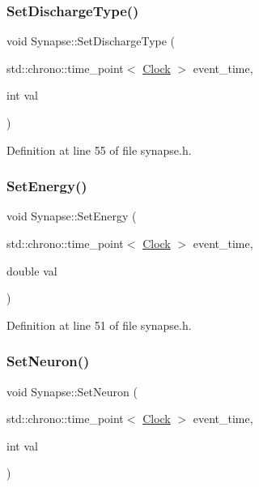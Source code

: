 \subsubsection{\texorpdfstring{Set\+Discharge\+Type()}{SetDischargeType()}}
{\footnotesize\ttfamily void Synapse\+::\+Set\+Discharge\+Type (\begin{DoxyParamCaption}\item[{std\+::chrono\+::time\+\_\+point$<$ \hyperlink{universe_8h_a0ef8d951d1ca5ab3cfaf7ab4c7a6fd80}{Clock} $>$}]{event\+\_\+time,  }\item[{int}]{val }\end{DoxyParamCaption})\hspace{0.3cm}{\ttfamily [inline]}}



Definition at line 55 of file synapse.\+h.

\mbox{\label{class_synapse_aa90b66763c8aca2ad8df535ffed5d4a9}} 
\subsubsection{\texorpdfstring{Set\+Energy()}{SetEnergy()}}
{\footnotesize\ttfamily void Synapse\+::\+Set\+Energy (\begin{DoxyParamCaption}\item[{std\+::chrono\+::time\+\_\+point$<$ \hyperlink{universe_8h_a0ef8d951d1ca5ab3cfaf7ab4c7a6fd80}{Clock} $>$}]{event\+\_\+time,  }\item[{double}]{val }\end{DoxyParamCaption})\hspace{0.3cm}{\ttfamily [inline]}}



Definition at line 51 of file synapse.\+h.

\mbox{\label{class_synapse_a278f054df3f4ff25683787ba8fe78263}} 
\subsubsection{\texorpdfstring{Set\+Neuron()}{SetNeuron()}}
{\footnotesize\ttfamily void Synapse\+::\+Set\+Neuron (\begin{DoxyParamCaption}\item[{std\+::chrono\+::time\+\_\+point$<$ \hyperlink{universe_8h_a0ef8d951d1ca5ab3cfaf7ab4c7a6fd80}{Clock} $>$}]{event\+\_\+time,  }\item[{int}]{val }\end{DoxyParamCaption})}



